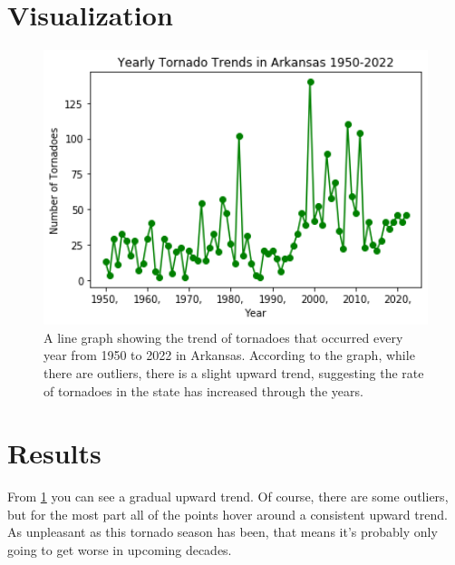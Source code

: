 \documentclass[12 pt., oneside, letterpaper]{article}
\begin{document}
\section{Visualization}
\begin{center}
\begin{figure}[h]
\includegraphics[width=1.0\textwidth]{graph}
\caption{A line graph showing the trend of tornadoes that occurred every year from 1950 to 2022 in Arkansas. 
         According to the graph, while there are outliers, there is a slight upward trend, suggesting the rate of tornadoes in the state has increased through the years.\cite{record_tornadoes}}
\label{fig:graph}
\end{figure}
\end{center}

\section{Results}
From \ref{fig:graph} you can see a gradual upward trend. Of course, there are some outliers, but for the most part all of the points hover around a consistent upward trend. As unpleasant as this tornado season has been, that means it's probably only going to get worse in upcoming decades. \\




\end{document}
